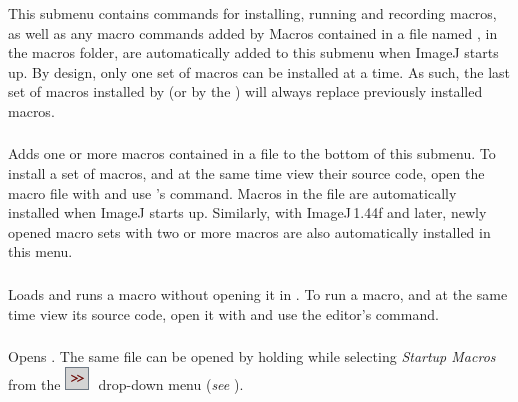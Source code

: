 This submenu contains commands for installing, running and recording
macros, as well as any macro commands added by 
Macros contained in a file named ,
in the macros folder, are automatically added to this submenu when
ImageJ starts up. By design, only one set of macros
can be installed at a time. As such, the last set of macros installed
by 
(or by the ) will always replace previously
installed macros.


\subsubsection{\protect{}\label{sub:Install...}}

Adds one or more macros contained in a file to the bottom of this
submenu. To install a set of macros, and at the same time view their
source code, open the macro file with 
and use 's 
command. Macros in the file 
are automatically installed when ImageJ starts up.
Similarly, with ImageJ\,1.44f and later, newly opened macro sets
with two or more macros are also automatically installed in this menu.




\subsubsection{\protect{}\label{sub:Run...}}

Loads and runs a macro without opening it in .
To run a macro, and at the same time view its source code, open it
with  and use the editor's 
command.


\subsubsection{\protect{}\label{sub:Startup-Macros...}}

Opens .
The same file can be opened by holding  while
selecting \emph{Startup Macros} from the \includegraphics[bb=0bp 5bp 20bp 20bp,scale=0.5]{images/tools/Switcher}\,\ drop-down
menu (\emph{see} ).


